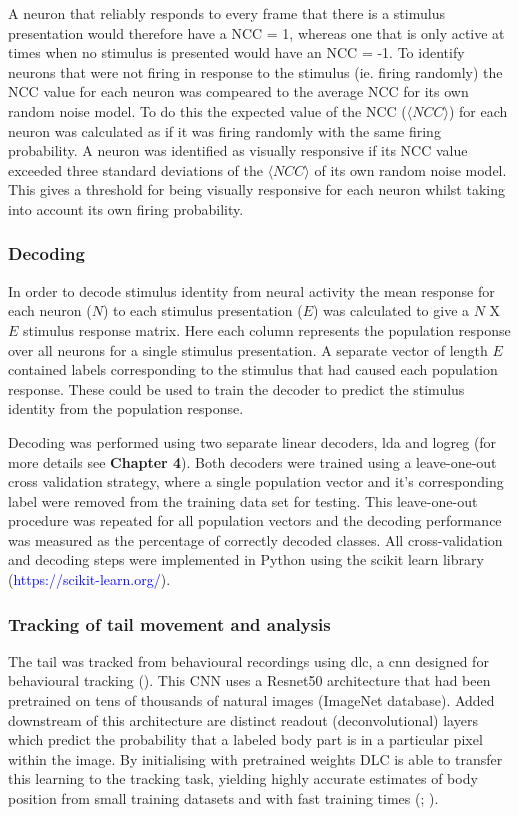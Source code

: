 A neuron that reliably responds to every frame that there is a stimulus presentation would therefore have a NCC = 1, whereas one that is only  active at times when no stimulus is presented would have an NCC = -1. To identify neurons that were not firing in response to the stimulus (ie. firing randomly) the NCC value for each neuron was compeared to the average NCC for its own random noise model. To do this the expected value of the NCC ($\langle NCC \rangle$) for each neuron was calculated as if it was firing randomly with the same firing probability. A neuron was identified as visually responsive if its NCC value exceeded three standard deviations of the $\langle NCC \rangle$ of its own random noise model. This gives a threshold for being visually responsive for each neuron whilst taking into account its own firing probability. 
 
\subsubsection{Decoding}
In order to decode stimulus identity from neural activity the mean response for each neuron ($N$) to each stimulus presentation ($E$) was calculated to give a $N$ X $E$ stimulus response matrix. Here each column represents the population response over all neurons for a single stimulus presentation. A separate vector of length $E$ contained labels corresponding to the stimulus that had caused each population response.
These could be used to train the decoder to predict the stimulus identity from the population response. 

Decoding was performed using two separate linear decoders, \gls{lda} and \gls{logreg} (for more details see \textbf{Chapter 4}). Both decoders were trained using a leave-one-out cross validation strategy,  where a single population vector and it's corresponding label were removed from the training data set for testing. This leave-one-out procedure was repeated for all population vectors and the decoding performance was measured as the percentage of correctly decoded classes. All cross-validation and decoding steps were implemented in Python using the scikit learn library (\textcolor{blue}{https://scikit-learn.org/}).


\subsubsection{Tracking of tail movement and analysis}
The tail was tracked from behavioural recordings using \gls{dlc}, a \gls{cnn} designed for behavioural tracking (\cite{Mathis2018DeepLabCut:Learning}). This CNN uses a Resnet50 architecture that had been pretrained on tens of thousands of natural images (ImageNet database). Added downstream of this architecture are distinct readout (deconvolutional) layers which predict the probability that a labeled body part is in a particular pixel within the image. By initialising with pretrained weights DLC is able to transfer this learning to the tracking task, yielding highly accurate estimates of body position from small training datasets and with fast training times (\cite{Mathis2018DeepLabCut:Learning}; \cite{Mathis2020DeepNeuroscience}). 

